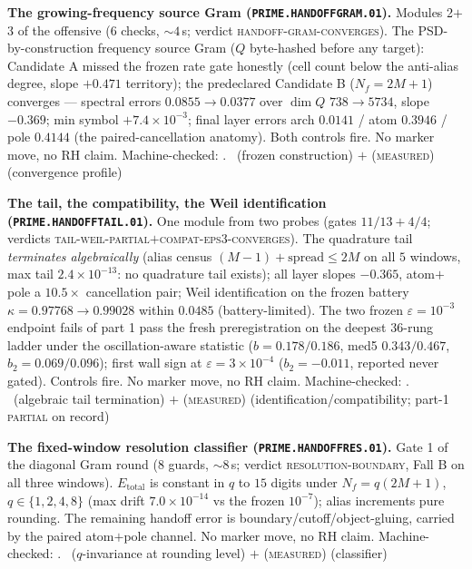 \par\smallskip\noindent\textbf{The growing-frequency source Gram
(\texttt{PRIME.HANDOFFGRAM.01}).}
Modules 2$+$3 of the offensive ($6$ checks, ${\sim}4$\,s; verdict
\textsc{handoff-gram-converges}).  The PSD-by-construction
frequency source Gram ($Q$ byte-hashed before any target):
Candidate A missed the frozen rate gate honestly (cell count below
the anti-alias degree, slope $+0.471$ territory); the predeclared
Candidate B ($N_f=2M{+}1$) converges --- spectral errors
$0.0855\to0.0377$ over $\dim Q$ $738\to5734$, slope $-0.369$; min
symbol $+7.4\times10^{-3}$; final layer errors arch $0.0141$ /
atom $0.3946$ / pole $0.4144$ (the paired-cancellation anatomy).
Both controls fire.  No marker move, no RH claim.
Machine-checked: .
\mE\ (frozen construction) $+$ (\textsc{measured}) (convergence
profile)
\par\smallskip


\par\smallskip\noindent\textbf{The tail, the compatibility, the
Weil identification (\texttt{PRIME.HANDOFFTAIL.01}).}
One module from two probes (gates $11/13+4/4$; verdicts
\textsc{tail-weil-partial}$+$\textsc{compat-eps3-converges}).  The
quadrature tail \emph{terminates algebraically} (alias census
$(M{-}1)+\mathrm{spread}\le2M$ on all $5$ windows, max tail
$2.4\times10^{-13}$: no quadrature tail exists); all layer slopes
$-0.365$, atom$+$pole a $10.5\times$ cancellation pair; Weil
identification on the frozen battery
$\kappa=0.97768\to0.99028$ within $0.0485$ (battery-limited).  The
two frozen $\varepsilon=10^{-3}$ endpoint fails of part 1 pass the
fresh preregistration on the deepest $36$-rung ladder under the
oscillation-aware statistic ($b=0.178/0.186$, med5 $0.343/0.467$,
$b_2=0.069/0.096$); first wall sign at $\varepsilon=3\times10^{-4}$
($b_2=-0.011$, reported never gated).  Controls fire.  No marker
move, no RH claim.
Machine-checked: .
\mE\ (algebraic tail termination) $+$ (\textsc{measured})
(identification/compatibility; part-1 \textsc{partial} on record)
\par\smallskip


\par\smallskip\noindent\textbf{The fixed-window resolution
classifier (\texttt{PRIME.HANDOFFRES.01}).}
Gate 1 of the diagonal Gram round ($8$ guards, ${\sim}8$\,s;
verdict \textsc{resolution-boundary}, Fall B on all three windows).
$E_{\mathrm{total}}$ is constant in $q$ to $15$ digits under
$N_f=q(2M{+}1)$, $q\in\{1,2,4,8\}$ (max drift $7.0\times10^{-14}$
vs the frozen $10^{-7}$); alias increments pure rounding.  The
remaining handoff error is boundary/cutoff/object-gluing, carried
by the paired atom$+$pole channel.  No marker move, no RH claim.
Machine-checked: .
\mE\ ($q$-invariance at rounding level) $+$ (\textsc{measured})
(classifier)
\par\smallskip


